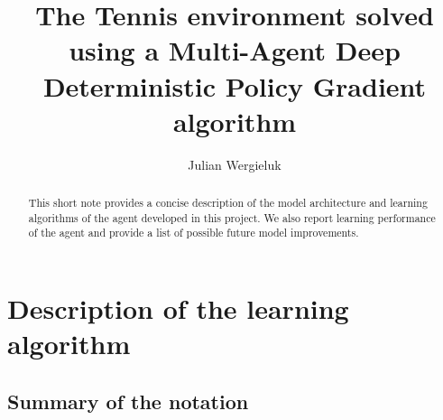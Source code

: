 \documentclass[a4paper,12pt]{amsart}
\title[Deep Deterministic Policy Gradients]{The Tennis environment solved using a Multi-Agent Deep Deterministic Policy Gradient algorithm}
\author{Julian Wergieluk}\address{}\email{julian.wergieluk@risklab.com}
\begin{document}
\maketitle

\begin{abstract}
This short note provides a concise description of the model architecture and
learning algorithms of the agent developed in this project. We also report learning
performance of the agent and provide a list of possible future model improvements.
\end{abstract}


\section{Description of the learning algorithm}

\subsection{Summary of the notation}

\end{document}
